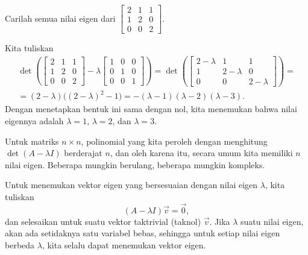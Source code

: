 \begin{example}
Carilah semua nilai eigen dari
$\left[ \begin{smallmatrix}
2 & 1 & 1 \\
1 & 2 & 0 \\
0 & 0 & 2
\end{smallmatrix} \right]$.

Kita tuliskan
\begin{multline*}
\det \left(
\begin{bmatrix}
2 & 1 & 1 \\
1 & 2 & 0 \\
0 & 0 & 2
\end{bmatrix}
- \lambda
\begin{bmatrix}
1 & 0 & 0 \\
0 & 1 & 0 \\
0 & 0 & 1
\end{bmatrix}
\right)
=
\det \left(
\begin{bmatrix}
2-\lambda & 1 & 1 \\
1 & 2-\lambda & 0 \\
0 & 0 & 2-\lambda
\end{bmatrix}
\right)
= \\
=
(2-\lambda) \bigl({(2-\lambda)}^2 - 1\bigr)
=
-(\lambda -1)(\lambda -2)(\lambda-3) .
\end{multline*}
Dengan menetapkan bentuk ini sama dengan nol, kita menemukan bahwa
nilai eigennya adalah $\lambda = 1$, $\lambda = 2$, dan
$\lambda = 3$.
\end{example}

Untuk matriks $n \times n$, polinomial yang kita peroleh dengan
menghitung $\det(A - \lambda I)$ berderajat $n$, dan oleh karena itu,
secara umum kita memiliki $n$ nilai eigen.  Beberapa mungkin berulang, beberapa mungkin
kompleks.

\medskip

Untuk menemukan vektor eigen yang bersesuaian dengan nilai eigen $\lambda$, kita tuliskan
\begin{equation*}
(A-\lambda I) \vec{v} = \vec{0} ,
\end{equation*}
dan selesaikan untuk suatu vektor taktrivial (taknol) $\vec{v}$.
Jika $\lambda$ suatu nilai eigen, akan ada setidaknya satu
variabel bebas, sehingga
untuk
setiap nilai eigen berbeda $\lambda$, kita selalu dapat menemukan vektor eigen.

